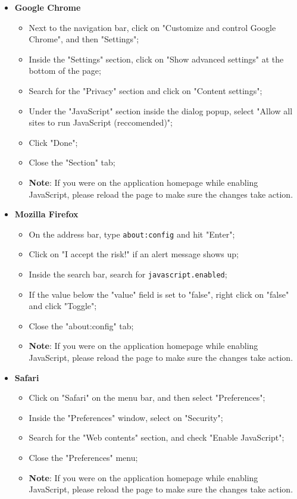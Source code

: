 \begin{itemize}
	\item \textbf{Google Chrome}
	\begin{itemize}
		\item Next to the navigation bar, click on "Customize and control Google Chrome", and then "Settings";
		\item Inside the "Settings" section, click on "Show advanced settings" at the bottom of the page;
		\item Search for the "Privacy" section and click on "Content settings";
		\item Under the "JavaScript" section inside the dialog popup, select "Allow all sites to run JavaScript (reccomended)";
		\item Click "Done";
		\item Close the "Section" tab;
		\item \textbf{Note}: If you were on the application homepage while enabling JavaScript, please reload the page to make sure the changes take action.
	\end{itemize}
	
	\item \textbf{Mozilla Firefox}
	\begin{itemize}
		\item On the address bar, type \texttt{about:config} and hit "Enter";
		\item Click on "I accept the risk!" if an alert message shows up;
		\item Inside the search bar, search for \texttt{javascript.enabled};
		\item If the value below the "value" field is set to "false", right click on "false" and click "Toggle";
		\item Close the "about:config" tab;
		\item \textbf{Note}: If you were on the application homepage while enabling JavaScript, please reload the page to make sure the changes take action.
	\end{itemize}
	
	\item \textbf{Safari}
	\begin{itemize}
		\item Click on "Safari" on the menu bar, and then select "Preferences";
		\item Inside the "Preferences" window, select on "Security";
		\item Search for the "Web contents" section, and check "Enable JavaScript"; 
		\item Close the "Preferences" menu;
		\item \textbf{Note}: If you were on the application homepage while enabling JavaScript, please reload the page to make sure the changes take action.
	\end{itemize}
\end{itemize}


